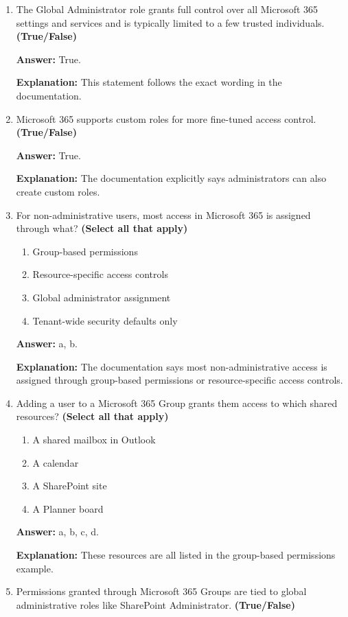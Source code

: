 \documentclass[10pt]{article}
\begin{document}
\begin{enumerate}[leftmargin=*]
\textbf{Explanation:} All five are named in the RBAC section.

\item The Global Administrator role grants full control over all Microsoft 365 settings and services and is typically limited to a few trusted individuals. \textbf{(True/False)}

\textbf{Answer:} True.

\textbf{Explanation:} This statement follows the exact wording in the documentation.

\item Microsoft 365 supports custom roles for more fine-tuned access control. \textbf{(True/False)}

\textbf{Answer:} True.

\textbf{Explanation:} The documentation explicitly says administrators can also create custom roles.

\item For non-administrative users, most access in Microsoft 365 is assigned through what? \textbf{(Select all that apply)}
\begin{enumerate}[label=\alph*., leftmargin=1.5em]
\item Group-based permissions
\item Resource-specific access controls
\item Global administrator assignment
\item Tenant-wide security defaults only
\end{enumerate}
\textbf{Answer:} a, b.

\textbf{Explanation:} The documentation says most non-administrative access is assigned through group-based permissions or resource-specific access controls.

\item Adding a user to a Microsoft 365 Group grants them access to which shared resources? \textbf{(Select all that apply)}
\begin{enumerate}[label=\alph*., leftmargin=1.5em]
\item A shared mailbox in Outlook
\item A calendar
\item A SharePoint site
\item A Planner board
\end{enumerate}
\textbf{Answer:} a, b, c, d.

\textbf{Explanation:} These resources are all listed in the group-based permissions example.

\item Permissions granted through Microsoft 365 Groups are tied to global administrative roles like SharePoint Administrator. \textbf{(True/False)}


\end{enumerate}
\end{document}
